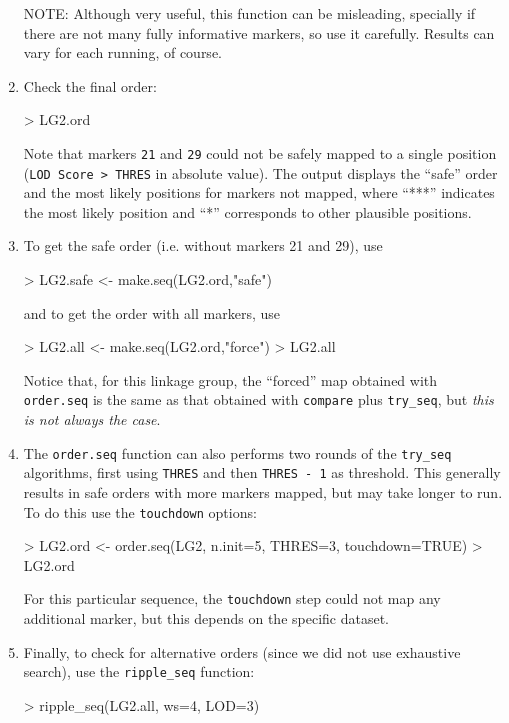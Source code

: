 \documentclass[letterpaper,12pt,oneside]{article}
\begin{document}
\begin{enumerate}
NOTE: Although very useful, this function can be misleading, specially if there are not many fully informative markers, so use it carefully. Results can vary for each running, of course.

\item Check the final order:
\begin{Schunk}
\begin{Sinput}
> LG2.ord
\end{Sinput}
\end{Schunk}
Note that markers {\tt 21} and {\tt 29} could not be safely mapped to a single position ({\tt LOD Score > THRES} in absolute value). The output displays the ``safe'' order and the most likely positions for markers not mapped, where ``***'' indicates the most likely position and ``*'' corresponds to other plausible positions.

\item To get the safe order (i.e. without markers 21 and 29), use 
\begin{Schunk}
\begin{Sinput}
> LG2.safe <- make.seq(LG2.ord,"safe")
\end{Sinput}
\end{Schunk}
and to get the order with all markers, use
\begin{Schunk}
\begin{Sinput}
> LG2.all <- make.seq(LG2.ord,"force")
> LG2.all
\end{Sinput}
\end{Schunk}
Notice that, for this linkage group, the ``forced'' map obtained with {\tt order.seq} is the same as that obtained with {\tt compare} plus {\tt try_seq}, but \emph{this is not always the case}.

\item The {\tt order.seq} function can also performs two rounds of the {\tt try_seq} algorithms, first using {\tt THRES} and then {\tt THRES - 1} as threshold. This generally results in safe orders with more markers mapped, but may take longer to run. To do this use the {\tt touchdown} options:
\begin{Schunk}
\begin{Sinput}
> LG2.ord <- order.seq(LG2, n.init=5, THRES=3, touchdown=TRUE)
> LG2.ord
\end{Sinput}
\end{Schunk}
For this particular sequence, the {\tt touchdown} step could not map any additional marker, but this depends on the specific dataset.

\item Finally, to check for alternative orders (since we did not use exhaustive search), use the {\tt ripple_seq} function:
\begin{Schunk}
\begin{Sinput}
> ripple_seq(LG2.all, ws=4, LOD=3)
\end{Sinput}
\end{Schunk}


\end{enumerate}
\end{document}
